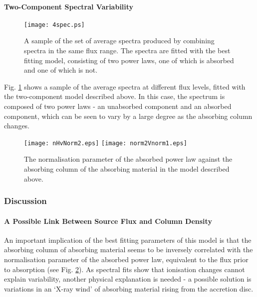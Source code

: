 \documentclass[letters,useAMS,usenatbib]{samnote}
\begin{document}
\paragraph{Two-Component Spectral Variability}

\begin{figure}
	\texttt{[image: 4spec.ps]}
	\caption{A sample of the set of average spectra produced by combining 
	spectra in the same flux range. The spectra are fitted with the best fitting model,
	consisting of two power laws, one of which is absorbed and one of which is not.}
	\label{spectra}
\end{figure} 

Fig. \ref{spectra} shows a sample of the average spectra at different flux levels, fitted with the two-component model described above.
In this case, the spectrum is composed of two power laws - an unabsorbed component and an absorbed component, which can be seen to vary by a large degree as the
absorbing column changes.  

\begin{figure}
	
	\texttt{[image: nHvNorm2.eps]}\hspace{1pt}
	\texttt{[image: norm2Vnorm1.eps]}\hspace{1pt}
	\caption{The normalisation parameter of the absorbed power law 
		against the absorbing column of the absorbing material in
		the model described above.}
	
	\label{normplots}
\end{figure}  


\subsubsection{Discussion}

\paragraph{A Possible Link Between Source Flux and Column Density}

An important implication of the best fitting parameters of this model is that the absorbing column of absorbing material seems to be inversely correlated with the
normalisation parameter of the absorbed power law, equivalent to the flux prior to absorption (see Fig. \ref{normplots}). As spectral fits show that ionisation changes
cannot explain variability, another physical explanation is needed - a possible solution is variations in an `X-ray wind' of absorbing material rising from the accretion
disc.
\end{document}
